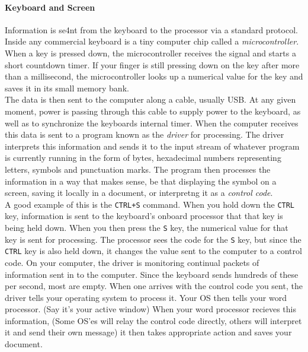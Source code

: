 \documentclass[english]{paper}
\begin{document}
\paragraph{Keyboard and Screen}
Information is se4nt from the keyboard to the processor via a standard protocol. Inside any commercial keyboard is a tiny computer chip
called a {\it microcontroller}. When a key is pressed down, the microcontroller receives the signal and starts a short countdown timer. If your finger is still pressing down on the key after more than a millisecond, the microcontroller looks up a numerical value for the key
and saves it in its small memory bank.
\break
\\The data is then sent to the computer along a cable, usually USB. At any given moment, power
is passing through this cable to supply power to the keyboard, as well as to synchronize the keyboards internal timer. When the
computer receives this data is sent to a program known as the {\it driver} for processing. The driver interprets this information
and sends it to the input stream of whatever program is currently running in the form of bytes, hexadecimal numbers representing
letters, symbols and punctuation marks. The program then processes the information in a way that makes sense, be that displaying
the symbol on a screen, saving it locally in a document, or interpretng it as a {\it control code}.
\break
\\A good example of this is the \texttt{CTRL+S} command. When you hold down the \texttt{CTRL} key, information is sent to the keyboard's onboard processor that that key is being held down. When you then press the \texttt{S} key, the numerical value for that key is sent for processing. The processor sees the code for the \texttt{S} key, but since the \texttt{CTRL} key is also held down, it changes the value sent to the computer to a control code. On your computer, the driver is monitoring continual packets of information sent in to the computer. Since the keyboard sends hundreds of these per second, most are empty. When one arrives with the control code you sent, the driver tells your operating system to process it. Your OS then tells your word processor. (Say it's your active window) When your word processor recieves this information, (Some OS'es will relay the control code directly, others will interpret it and send their own message) it then takes appropriate action and saves your document.
\break
\end{document}

